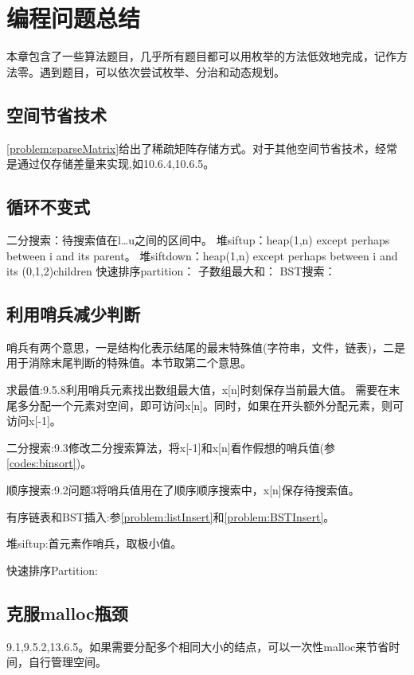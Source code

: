 

\section{编程问题总结}

本章包含了一些算法题目，几乎所有题目都可以用枚举的方法低效地完成，记作方法零。遇到题目，可以依次尝试枚举、分治和动态规划。

\subsection{空间节省技术}
\ref{problem:sparseMatrix}给出了稀疏矩阵存储方式。对于其他空间节省技术，经常是通过仅存储差量来实现,如\cite{pp}10.6.4,10.6.5。

\subsection{循环不变式}
二分搜索：待搜索值在l\dots u之间的区间中。
堆siftup：heap(1,n) except perhaps between i and its parent。
堆siftdown：heap(1,n) except perhaps between i and its (0,1,2)children
快速排序partition：
子数组最大和：
BST搜索：

\subsection{利用哨兵减少判断}
哨兵有两个意思\cite{wikipedia}，一是结构化表示结尾的最末特殊值(字符串，文件，链表)，二是用于消除末尾判断的特殊值。本节取第二个意思。

求最值:\cite{pp}9.5.8利用哨兵元素找出数组最大值，x[n]时刻保存当前最大值。 需要在末尾多分配一个元素对空间，即可访问x[n]。同时，如果在开头额外分配元素，则可访问x[-1]。

二分搜索:\cite{pp}9.3修改二分搜索算法，将x[-1]和x[n]看作假想的哨兵值(参\ref{codes:binsort})。

顺序搜索:\cite{pp}9.2问题3将哨兵值用在了顺序顺序搜索中，x[n]保存待搜索值。

有序链表和BST插入:参\ref{problem:listInsert}和\ref{problem:BSTInsert}。

堆siftup:首元素作哨兵，取极小值。

快速排序Partition:

\subsection{克服malloc瓶颈}
\cite{pp}9.1,9.5.2,13.6.5。如果需要分配多个相同大小的结点，可以一次性malloc来节省时间，自行管理空间。

